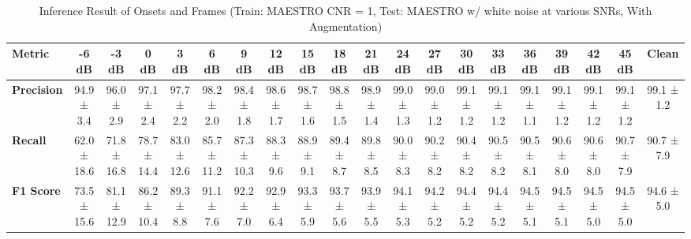 \documentclass{article}
\begin{document}
\begin{table*}[htbp]
\centering
\caption{Inference Result of Onsets and Frames (Train: MAESTRO CNR = 1, Test: MAESTRO w/ white noise at various SNRs, With Augmentation)}
\begin{adjustbox}{max width=\textwidth}
\begin{tabular}{@{}lccccccccccccccccccc@{}}
\toprule
\textbf{Metric} & \textbf{-6 dB} & \textbf{-3 dB} & \textbf{0 dB} & \textbf{3 dB} & \textbf{6 dB} & \textbf{9 dB} & \textbf{12 dB} & \textbf{15 dB} & \textbf{18 dB} & \textbf{21 dB} & \textbf{24 dB} & \textbf{27 dB} & \textbf{30 dB} & \textbf{33 dB} & \textbf{36 dB} & \textbf{39 dB} & \textbf{42 dB} & \textbf{45 dB} & \textbf{Clean} \\ 
\midrule
\textbf{Precision} & 94.9 ± 3.4 & 96.0 ± 2.9 & 97.1 ± 2.4 & 97.7 ± 2.2 & 98.2 ± 2.0 & 98.4 ± 1.8 & 98.6 ± 1.7 & 98.7 ± 1.6 & 98.8 ± 1.5 & 98.9 ± 1.4 & 99.0 ± 1.3 & 99.0 ± 1.2 & 99.1 ± 1.2 & 99.1 ± 1.2 & 99.1 ± 1.1 & 99.1 ± 1.2 & 99.1 ± 1.2 & 99.1 ± 1.2 & 99.1 ± 1.2 \\
\textbf{Recall}    & 62.0 ± 18.6 & 71.8 ± 16.8 & 78.7 ± 14.4 & 83.0 ± 12.6 & 85.7 ± 11.2 & 87.3 ± 10.3 & 88.3 ± 9.6 & 88.9 ± 9.1 & 89.4 ± 8.7 & 89.8 ± 8.5 & 90.0 ± 8.3 & 90.2 ± 8.2 & 90.4 ± 8.2 & 90.5 ± 8.2 & 90.5 ± 8.1 & 90.6 ± 8.0 & 90.6 ± 8.0 & 90.7 ± 7.9 & 90.7 ± 7.9 \\
\textbf{F1 Score}  & 73.5 ± 15.6 & 81.1 ± 12.9 & 86.2 ± 10.4 & 89.3 ± 8.8 & 91.1 ± 7.6 & 92.2 ± 7.0 & 92.9 ± 6.4 & 93.3 ± 5.9 & 93.7 ± 5.6 & 93.9 ± 5.5 & 94.1 ± 5.3 & 94.2 ± 5.2 & 94.4 ± 5.2 & 94.4 ± 5.2 & 94.5 ± 5.1 & 94.5 ± 5.1 & 94.5 ± 5.0 & 94.5 ± 5.0 & 94.6 ± 5.0 \\
\bottomrule
\end{tabular}
\end{adjustbox}
\end{table*}
\end{document}
